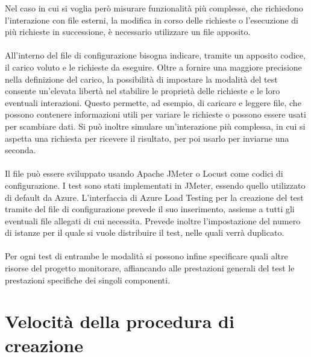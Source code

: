 Nel caso in cui si voglia però misurare funzionalità più complesse, 
che richiedono l'interazione con file esterni, la modifica in corso delle richieste o 
l'esecuzione di più richieste in successione, è necessario utilizzare un file apposito.\\
\\
All'interno del file di configurazione bisogna indicare, tramite un apposito codice,
il carico voluto e le richieste da eseguire.
Oltre a fornire una maggiore precisione nella definizione del carico, 
la possibilità di impostare la modalità del test
consente un'elevata libertà nel stabilire le proprietà delle richieste e le loro eventuali interazioni.
Questo permette, ad esempio, di caricare e leggere file, 
che possono contenere informazioni utili per variare le richieste o
possono essere usati per scambiare dati.
Si può inoltre simulare un'interazione più complessa,
in cui si aspetta una richiesta per ricevere il risultato, 
per poi usarlo per inviarne una seconda.\\
\\
Il file può essere sviluppato usando Apache JMeter o Locust come codici di configurazione.
I test sono stati implementati in JMeter,
essendo quello utilizzato di default da Azure.
L'interfaccia di Azure Load Testing per la creazione del test tramite del file di configurazione
prevede il suo inserimento, assieme a tutti gli eventuali file allegati di cui necessita.
Prevede inoltre l'impostazione del numero di istanze 
per il quale si vuole distribuire il test, nelle quali verrà duplicato.\\
\\
Per ogni test di entrambe le modalità si possono infine specificare quali altre risorse del progetto monitorare,
affiancando alle prestazioni generali del test le prestazioni specifiche dei singoli componenti.

\section{Velocità della procedura di creazione}

